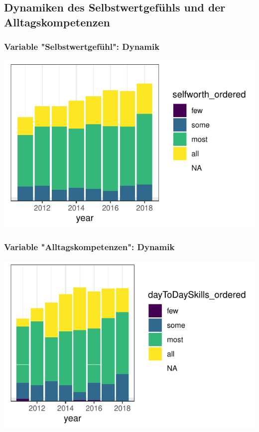 \subsection{Dynamiken des Selbstwertgefühls und der Alltagskompetenzen}

\begin{frame}[fragile]
\frametitle{Variable "Selbstwertgefühl": Dynamik}
\begin{knitrout}\footnotesize
{}\color{fgcolor}

{\centering \includegraphics[width=\maxwidth]{figure/beamer-SelfworthTime-1} 

}



\end{knitrout}
\end{frame}

\begin{frame}[fragile]
\frametitle{Variable "Alltagskompetenzen": Dynamik}
\begin{knitrout}\footnotesize
{}\color{fgcolor}

{\centering \includegraphics[width=\maxwidth]{figure/beamer-DayToDayTime-1} 

}



\end{knitrout}
\end{frame}

